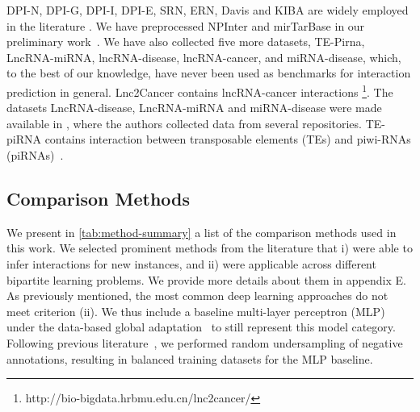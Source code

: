 \documentclass[letterpaper]{article}
\begin{document}
DPI-N, DPI-G, DPI-I, DPI-E, SRN, ERN, Davis and KIBA are widely employed in the literature \cite{schrynemackers_classifying_2015,pliakos_network_2019,huang_moltrans_2020}. We have preprocessed NPInter and mirTarBase in our preliminary work~\cite{ilidio_fast_2024}. We have also collected five more datasets, TE-Pirna, LncRNA-miRNA, lncRNA-disease, lncRNA-cancer, and miRNA-disease, which, to the best of our knowledge, have never been used as benchmarks for interaction prediction in general.
Lnc2Cancer contains lncRNA-cancer interactions \cite{gao2021lnc2cancer}\footnote{http://bio-bigdata.hrbmu.edu.cn/lnc2cancer/}.
The datasets LncRNA-disease, LncRNA-miRNA and miRNA-disease were made available in \cite{sheng2023data}, where the authors collected data from several repositories.
TE-piRNA contains interaction between transposable elements (TEs) and piwi-RNAs (piRNAs)~\cite{dos2024transposable}.


\subsection{Comparison Methods}
\label{sec:baselines}


We present in \cref{tab:method-summary} a list of the comparison methods used in this work. We selected prominent methods from the literature that i) were able to infer interactions for new instances, and ii) were applicable across different bipartite learning problems. We provide more details about them in
appendix E.
As previously mentioned, the most common deep learning approaches do not meet criterion (ii). We thus include a baseline multi-layer perceptron (MLP)~\cite{hinton1990connectionist} under the data-based global adaptation~\cite{schrynemackers_protocols_2013} to still represent this model category. Following previous literature~\cite{huang_moltrans_2020,dehghan_tripletmultidti_2023}, we performed random undersampling of negative annotations, resulting in balanced training datasets for the MLP baseline.
\end{document}
